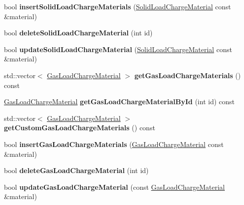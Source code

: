 \begin{DoxyCompactItemize}
bool {\bfseries insert\+Solid\+Load\+Charge\+Materials} (\hyperlink{class_solid_load_charge_material}{Solid\+Load\+Charge\+Material} const \&material)
\item 
\mbox{\label{class_s_q_lite_a0a240c89a1e0c96ef61c3beae68b1467}} 
bool {\bfseries delete\+Solid\+Load\+Charge\+Material} (int id)
\item 
\mbox{\label{class_s_q_lite_ac2c7142caa0154783f7ed73afa4bd6db}} 
bool {\bfseries update\+Solid\+Load\+Charge\+Material} (\hyperlink{class_solid_load_charge_material}{Solid\+Load\+Charge\+Material} const \&material)
\item 
\mbox{\label{class_s_q_lite_accd7e97b19298b75eabc3a2b4bbc9b1c}} 
std\+::vector$<$ \hyperlink{class_gas_load_charge_material}{Gas\+Load\+Charge\+Material} $>$ {\bfseries get\+Gas\+Load\+Charge\+Materials} () const
\item 
\mbox{\label{class_s_q_lite_ab89ac4049cbedcb6340f5d7d0139b89e}} 
\hyperlink{class_gas_load_charge_material}{Gas\+Load\+Charge\+Material} {\bfseries get\+Gas\+Load\+Charge\+Material\+By\+Id} (int id) const
\item 
\mbox{\label{class_s_q_lite_a1957d2f9ac35433b45e8511aa6889756}} 
std\+::vector$<$ \hyperlink{class_gas_load_charge_material}{Gas\+Load\+Charge\+Material} $>$ {\bfseries get\+Custom\+Gas\+Load\+Charge\+Materials} () const
\item 
\mbox{\label{class_s_q_lite_af482f51c0d3de08fbfa3e537382a567f}} 
bool {\bfseries insert\+Gas\+Load\+Charge\+Materials} (\hyperlink{class_gas_load_charge_material}{Gas\+Load\+Charge\+Material} const \&material)
\item 
\mbox{\label{class_s_q_lite_a3717a443c1151d717168d323ec6576c1}} 
bool {\bfseries delete\+Gas\+Load\+Charge\+Material} (int id)
\item 
\mbox{\label{class_s_q_lite_a21b8fbcd52ac37fe9e78df164ee8de25}} 
bool {\bfseries update\+Gas\+Load\+Charge\+Material} (const \hyperlink{class_gas_load_charge_material}{Gas\+Load\+Charge\+Material} \&material)
\item 
\mbox{\label{class_s_q_lite_a349f65213cc1b022293bc00ba0a4c3b5}} 

\end{DoxyCompactItemize}
